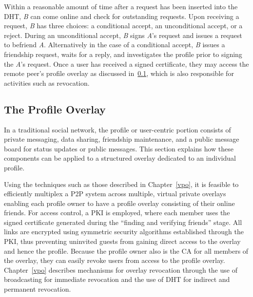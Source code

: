 Within a reasonable amount of time after a request has been inserted into the
DHT, \textit{B} can come online and check for outstanding requests.  Upon
receiving a request, \textit{B} has three choices: a conditional accept, an
unconditional accept, or a reject.  During an unconditional accept, \textit{B}
signs \textit{A}'s request and issues a request to befriend \textit{A}.
Alternatively in the case of a conditional accept, \textit{B} issues a friendship
request, waits for a reply, and investigates the profile prior to signing the
\textit{A}'s request.  Once a user has received a signed certificate,
they may access the remote peer's profile overlay as discussed
in~\ref{profile_overlay}, which is also responsible for activities such as
revocation.


\subsection{The Profile Overlay}
\label{profile_overlay}
In a traditional social network, the profile or user-centric portion consists
of private messaging, data sharing, friendship maintenance, and a public
message board for status updates or public messages.  This section explains how
these components can be applied to a structured overlay dedicated to an
individual profile.

Using the techniques such as those described in Chapter~\ref{vpo}, it is feasible
to efficiently multiplex a P2P system across multiple, virtual private overlays enabling
each profile owner to have a profile overlay consisting of their online friends.
For access control, a PKI is employed, where each member uses the signed certificate
generated during the ``finding and verifying friends'' stage.  All links are
encrypted using symmetric security algorithms established through the PKI,
thus preventing uninvited guests from gaining direct access to the overlay and
hence the profile.  Because the profile owner also is the CA for all members of
the overlay, they can easily revoke users from access to the profile overlay.
Chapter~\ref{vpo} describes mechanisms for overlay revocation through the
use of broadcasting for immediate revocation and the use of DHT for indirect
and permanent revocation.

